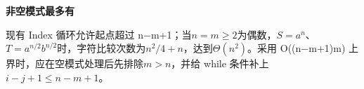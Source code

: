 {\color{ink}\bfseries 非空模式最多有}\par\vspace{1bp}现有 Index 循环允许起点超过 n\(-\)m+\allowbreak{}1；当\(n=\allowbreak{}m\ge 2\)为偶数，\(S=\allowbreak{}a^{n}\)、\(T=\allowbreak{}a^{n/\allowbreak{}2}b^{n/\allowbreak{}2}\)时，字符比较次数为\(n^{2}/\allowbreak{}4+\allowbreak{}n\)，达到\(\Theta (n^{2})\)。采用 O((n\(-\)m+\allowbreak{}1)m) 上界时，应在空模式处理后先排除\(m>\allowbreak{}n\)，并给 while 条件补上\(i-j+\allowbreak{}1\le n-m+\allowbreak{}1\)。
